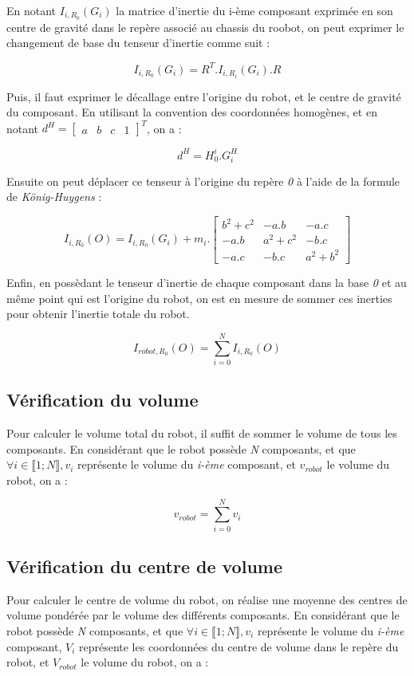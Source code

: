 				En notant $I_{i, R_0}(G_i)$ la matrice d'inertie du i-ème composant exprimée en son centre de gravité dans le repère associé au chassis du roobot, on peut exprimer le changement de base du tenseur d'inertie comme suit :

				$$I_{i, R_0}(G_i) = R^T.I_{i, R_i}(G_i).R$$

				Puis, il faut exprimer le décallage entre l'origine du robot, et le centre de gravité du composant. En utilisant la convention des coordonnées homogènes, et en notant $d^H = \begin{bmatrix}a & b & c & 1\end{bmatrix}^T$, on a :

				$$d^H = H_0^i . G_i^H$$

				Ensuite on peut déplacer ce tenseur à l'origine du repère \textit{0} à l'aide de la formule de \textit{König-Huygens} :

				$$I_{i, R_0}(O) = I_{i, R_0}(G_i) + m_i.\begin{bmatrix} b^2 + c^2 & -a.b & -a.c \\ -a.b & a^2 + c^2 & -b.c \\ -a.c & -b.c & a^2 + b^2 \end{bmatrix}$$

				Enfin, en possèdant le tenseur d'inertie de chaque composant dans la base \textit{0} et au même point qui est l'origine du robot, on est en mesure de sommer ces inerties pour obtenir l'inertie totale du robot.

				$$I_{robot, R_0}(O) = \sum_{i=0}^N I_{i, R_0}(O)$$

			\subsection{Vérification du volume}

				Pour calculer le volume total du robot, il suffit de sommer le volume de tous les composants. En considérant que le robot possède \textit{N} composants, et que $\forall i \in \llbracket 1; N \rrbracket, v_i$ représente le volume du \textit{i-ème} composant, et $v_{robot}$ le volume du robot, on a :

				$$v_{robot} = \sum_{i=0}^{N}v_i$$

			\subsection{Vérification du centre de volume}

				Pour calculer le centre de volume du robot, on réalise une moyenne des centres de volume pondérée par le volume des différents composants. En considérant que le robot possède \textit{N} composants, et que $\forall i \in \llbracket 1; N \rrbracket, v_i$ représente le volume du \textit{i-ème} composant, $V_i$ représente les coordonnées du centre de volume dans le repère du robot, et $V_{robot}$ le volume du robot, on a :

